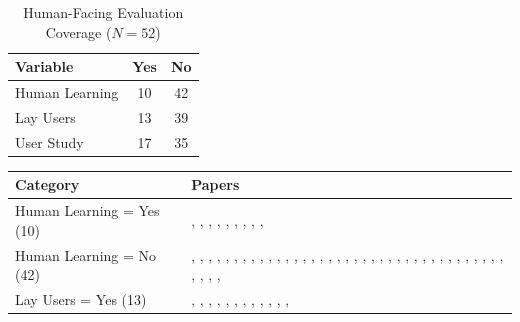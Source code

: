 \begin{table}[tbp]
\centering
\small
\begin{tabular}{lcc}
\toprule
\textbf{Variable} & \textbf{Yes} & \textbf{No} \\
\midrule
Human Learning & 10 & 42 \\
Lay Users & 13 & 39 \\
User Study & 17 & 35 \\
\bottomrule
\end{tabular}
\caption{Human-Facing Evaluation Coverage ($N=52$)}
\label{tab:human-facing}
\end{table}

\begin{table}[tbp]
\centering
\small
\begin{tabular}{p{4cm}p{11cm}}
\toprule
\textbf{Category} & \textbf{Papers} \\
\midrule
Human Learning = Yes (10) & \cite{Berrezueta-Guzman2024Future}, \cite{Chen2025MIND}, \cite{Feng2025Reframe}, \cite{Li2024Understanding}, \cite{Louie2026Can}, \cite{Qiu2026PsyCLIENT}, \cite{Tanana2019Development}, \cite{Wang2024PATIENT}, \cite{Wang2025Psychological}, \cite{Xiao2024HealMe} \\
\midrule
Human Learning = No (42) & \cite{Aghakhani2025From}, \cite{Basar2024To}, \cite{Basar2025How}, \cite{Cai2026Exploring}, \cite{Chen2023LLM-empowered}, \cite{Chiu2024A}, \cite{Deshpande2025Evaluating}, \cite{Fouda2026PsychiatryBench}, \cite{Gabriel2024Can}, \cite{Haydarov2025Towards}, \cite{Hu2024PsycoLLM}, \cite{Jaiswal2024Building}, \cite{Kang2024Can}, \cite{Kermani2025Systematic}, \cite{Kim2025Can}, \cite{Kim2025KMI}, \cite{Kim2025MIRROR}, \cite{Kuhail2025Human-Human}, \cite{Lee2024CACTUS}, \cite{Liu2023ChatCounselor}, \cite{Liu2025Eeyore}, \cite{Louie2024Roleplay-doh}, \cite{Na2024CBT-LLM}, \cite{Nguyen2025Do}, \cite{Ozgun2025Trustworthy}, \cite{Qiu2025EmoAgent}, \cite{Samuel2025PersonaGym}, \cite{Schmidgall2025AgentClinic}, \cite{Schmidmaier2025Using}, \cite{Schmidmaier2025UsingNonverbal}, \cite{Sharma2023Cognitive}, \cite{Sungarda2025GenAI}, \cite{Wang2024Towards}, \cite{Wang2025AnnaAgent}, \cite{Wang2025CARE-Bench}, \cite{Wang2025Feel}, \cite{Xie2025PsyDT}, \cite{Xu2025MentalChat16K}, \cite{Xu2025MultiAgentESC}, \cite{Yang2025CAMI}, \cite{Yang2025Consistent}, \cite{Zhang2025CBT-BENCH} \\
\midrule
Lay Users = Yes (13) & \cite{Basar2024To}, \cite{Basar2025How}, \cite{Chen2023LLM-empowered}, \cite{Chen2025MIND}, \cite{Feng2025Reframe}, \cite{Jaiswal2024Building}, \cite{Kang2024Can}, \cite{Lee2024CACTUS}, \cite{Louie2026Can}, \cite{Schmidmaier2025Using}, \cite{Schmidmaier2025UsingNonverbal}, \cite{Sharma2023Cognitive}, \cite{Tanana2019Development} \\

\end{tabular}
\end{table}
